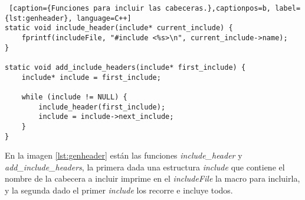 \bigskip

\begin{lstlisting} [caption={Funciones para incluir las cabeceras.},captionpos=b, label={lst:genheader}, language=C++]
static void include_header(include* current_include) {
	fprintf(includeFile, "#include <%s>\n", current_include->name);
}

static void add_include_headers(include* first_include) {
	include* include = first_include;

	while (include != NULL) {
		include_header(first_include);
		include = include->next_include;
	}
}
\end{lstlisting}

\bigskip

En la imagen \ref{lst:genheader} están las funciones \textit{include\_header} y \textit{add\_include\_headers}, la primera dada una estructura \textit{include} que contiene el nombre de la cabecera a incluir imprime en el \textit{includeFile} la macro para incluirla, y la segunda dado el primer \textit{include} los recorre e incluye todos.